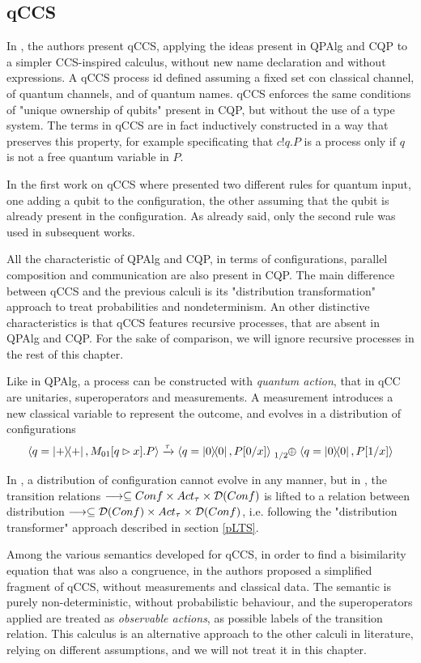 \subsection{qCCS}

In \cite{fengProbabilisticBisimulationsQuantum2007}, the authors present qCCS, applying the ideas present in QPAlg and CQP to a simpler CCS-inspired calculus, without new name declaration and without expressions. A qCCS process id defined assuming a fixed set con classical channel, of quantum channels, and of quantum names. qCCS enforces the same conditions of "unique ownership of qubits" present in CQP, but without the use of a type system. The terms in qCCS are in fact inductively constructed in a way that preserves this property, for example specificating that $c!q.P$ is a process only if $q$ is not a free quantum variable in $P$.


In the first work on qCCS where presented two different rules for quantum input, one adding a qubit to the configuration, the other assuming that the qubit is already present in the configuration. As already said, only the second rule was used in subsequent works.


All the characteristic of QPAlg and CQP, in terms of configurations, parallel composition and communication are also present in CQP. The main difference between qCCS and the previous calculi is its "distribution transformation" approach to treat probabilities and nondeterminism. An other distinctive characteristics is that qCCS features recursive processes, that are absent in QPAlg and CQP. For the sake of comparison, we will ignore recursive processes in the rest of this chapter.


Like in QPAlg, a process can be constructed with \textit{quantum action}, that in qCC  are unitaries, superoperators and measurements. A measurement introduces a new classical variable to represent the outcome, and evolves in a distribution of configurations
\[ \confw{q = \proj{+}, M_{01}[q \rhd x].P} \xrightarrow{\tau} \confw{q = \proj{0}, P[0/x]} \psum{1/2} \confw{q = \proj{0}, P[1/x]} 
\]

In \cite{fengProbabilisticBisimulationsQuantum2007}, a distribution of configuration cannot evolve in any manner, but in \cite{fengBisimulationQuantumProcesses2012, dengOpenBisimulationQuantum2012}, the transition relations $\longrightarrow \subseteq Conf \times Act_\tau \times \mathcal{D}(Conf)$ is lifted to a relation between distribution $\longrightarrow \subseteq \mathcal{D}(Conf) \times Act_\tau \times \mathcal{D}(Conf)$, i.e. following the "distribution transformer" approach described in section \ref{pLTS}.


Among the various semantics developed for qCCS, in order to find a bisimilarity equation that was also a congruence, in \cite{yingAlgebraQuantumProcesses2010} the authors proposed a simplified fragment of qCCS, without measurements and classical data. The semantic is purely non-deterministic, without probabilistic behaviour, and the superoperators applied are treated as \textit{observable actions}, as possible labels of the transition relation. This calculus is an alternative approach to the other calculi in literature, relying on different assumptions, and we will not treat it in this chapter.
